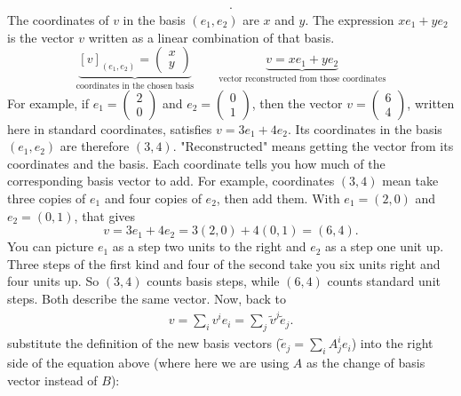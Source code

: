 \documentclass{report}
\begin{document}
\begin{itemize}
\begin{align*}
            .\end{align*}
            The coordinates of \(v\) in the basis \((e_1,e_2)\) are \(x\) and \(y\). The expression \(xe_1+ye_2\) is the vector \(v\) written as a linear combination of that basis.
            \[
                \underbrace{[v]_{(e_1,e_2)}=\begin{pmatrix}x\\y\end{pmatrix}}_{\text{coordinates in the chosen basis}}
                \qquad
                \underbrace{v=xe_1+ye_2}_{\text{vector reconstructed from those coordinates}}
            \]
            For example, if \(e_1=\begin{pmatrix}2\\0\end{pmatrix}\) and \(e_2=\begin{pmatrix}0\\1\end{pmatrix}\), then the vector \(v=\begin{pmatrix}6\\4\end{pmatrix}\), written here in standard coordinates, satisfies \(v=3e_1+4e_2\). Its coordinates in the basis \((e_1,e_2)\) are therefore \((3,4)\).
            \bigbreak \noindent 
            "Reconstructed" means getting the vector from its coordinates and the basis. Each coordinate tells you how much of the corresponding basis vector to add.
            \bigbreak \noindent 
            For example, coordinates \((3,4)\) mean take three copies of \(e_1\) and four copies of \(e_2\), then add them. With \(e_1=(2,0)\) and \(e_2=(0,1)\), that gives
            \[
                v=3e_1+4e_2=3(2,0)+4(0,1)=(6,4).
            \]
            \bigbreak \noindent 
            You can picture \(e_1\) as a step two units to the right and \(e_2\) as a step one unit up. Three steps of the first kind and four of the second take you six units right and four units up. So \((3,4)\) counts basis steps, while \((6,4)\) counts standard unit steps. Both describe the same vector.
            \bigbreak \noindent 
            Now, back to 
            \begin{align*}
                v = \sum_i v^{i}e_{i} = \sum_j\tilde{v}^{j}\tilde{e}_{j}
            .\end{align*}
            substitute the definition of the new basis vectors (\(\tilde{e}_j = \sum_i A^i_j e_i\)) into the right side of the equation above (where here we are using $A$ as the change of basis vector instead of $B$):

\end{itemize}
\end{document}
